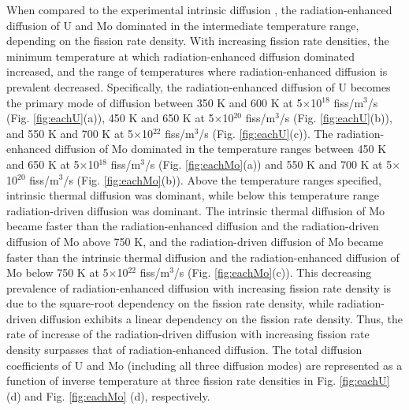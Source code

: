 \documentclass[preprint,12pt]{elsarticle}
\begin{document}
When compared to the experimental intrinsic diffusion \cite{huang2013}, the radiation-enhanced diffusion of U and Mo dominated in the intermediate temperature range, depending on the fission rate density. With increasing fission rate densities, the minimum temperature at which radiation-enhanced diffusion dominated increased, and the range of temperatures where radiation-enhanced diffusion is prevalent decreased. Specifically, the radiation-enhanced diffusion of U becomes the primary mode of diffusion between 350 K and 600 K at 5$\times$10$^{18}$ fiss/m$^{3}$/s (Fig. \ref{fig:eachU}(a)), 450 K and 650 K at 5$\times$10$^{20}$ fiss/m$^{3}$/s (Fig. \ref{fig:eachU}(b)), and 550 K and 700 K at 5$\times$10$^{22}$ fiss/m$^{3}$/s (Fig. \ref{fig:eachU}(c)). The radiation-enhanced diffusion of Mo dominated in the temperature ranges between 450 K and 650 K at 5$\times$10$^{18}$ fiss/m$^{3}$/s (Fig. \ref{fig:eachMo}(a)) and 550 K and 700 K at 5$\times$10$^{20}$ fiss/m$^{3}$/s (Fig. \ref{fig:eachMo}(b)). Above the temperature ranges specified, intrinsic thermal diffusion was dominant, while below this temperature range radiation-driven diffusion was dominant. The intrinsic thermal diffusion of Mo became faster than the radiation-enhanced diffusion and the radiation-driven diffusion of Mo above 750 K, and the radiation-driven diffusion of Mo became faster than the intrinsic thermal diffusion and the radiation-enhanced diffusion of Mo below 750 K at 5$\times$10$^{22}$ fiss/m$^{3}$/s (Fig. \ref{fig:eachMo}(c)). This decreasing prevalence of radiation-enhanced diffusion with increasing fission rate density is due to the square-root dependency on the fission rate density, while radiation-driven diffusion exhibits a linear dependency on the fission rate density. Thus, the rate of increase of the radiation-driven diffusion with increasing fission rate density surpasses that of radiation-enhanced diffusion. The total diffusion coefficients of U and Mo (including all three diffusion modes) are represented as a function of inverse temperature at three fission rate densities in Fig. \ref{fig:eachU} (d) and Fig. \ref{fig:eachMo} (d), respectively. 
\\
\end{document}
